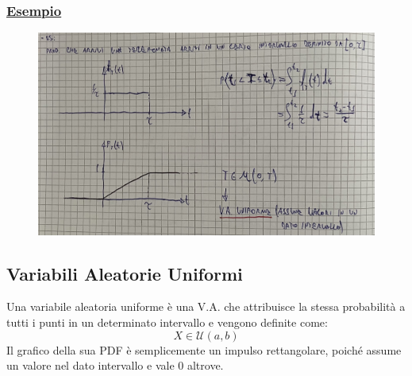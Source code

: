 \documentclass{article}
\begin{document}
\subsubsection{\underline{Esempio}}
\begin{figure}[ht]
\centering
\includegraphics[scale=0.12]{ese/14.jpeg}
\end{figure}

\subsection{Variabili Aleatorie Uniformi}
Una variabile aleatoria uniforme è una V.A. che attribuisce la stessa probabilità a tutti i punti in un determinato intervallo e vengono definite come:
\[X \in \mathcal{U}(a,b)\]
Il grafico della sua PDF è semplicemente un impulso rettangolare, poiché assume un valore nel dato intervallo e vale $0$ altrove.
\end{document}
